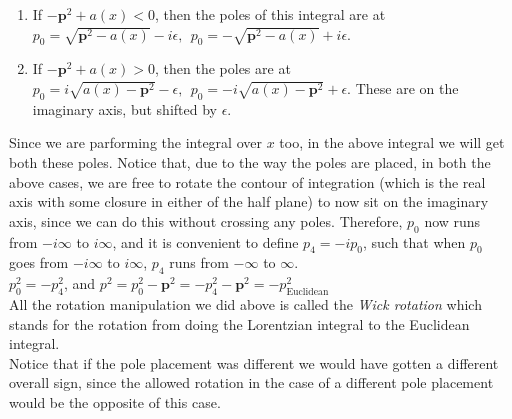 \documentclass[11pt]{article}
\numberwithin{equation}{section}
\begin{document}
\begin{enumerate}
    \item If \(-\textbf{p}^2 + a(x) <0\), then the poles of this integral are at \(p_0 = \sqrt{\textbf{p}^2 - a(x)} - i\epsilon,~~p_0 = -\sqrt{\textbf{p}^2 - a(x)} + i\epsilon\).
    \begin{figure}[h]
        \centering
    \end{figure} 
    \item If \(-\textbf{p}^2 + a(x) >0\), then the poles are at \(p_0 = i\sqrt{a(x)-\textbf{p}^2 } - \epsilon,~~p_0 = -i\sqrt{a(x)-\textbf{p}^2} + \epsilon\). These are on the imaginary axis, but shifted by \(\epsilon\).
    \begin{figure}[h]
        \centering
    \end{figure} 
\end{enumerate}
Since we are parforming the integral over \(x\) too, in the above integral we will get both these poles. Notice that, due to the way the poles are placed, in both the above cases, we are free to rotate the contour of integration (which is the real axis with some closure in either of the half plane) to now sit on the imaginary axis, since we can do this without crossing any poles. Therefore, \(p_0\) now runs from \(-i\infty\) to \(i\infty\), and it is convenient to define \(p_4 = -ip_0\), such that when \(p_0\) goes from \(-i\infty\) to \(i\infty\), \(p_4\) runs from \(-\infty\) to \(\infty\). \\
\(p_0^2 = - p_4^2\), and \(p^2 = p_0^2 - \textbf{p}^2 = -p_4^2 - \textbf{p}^2 = -p^2_{\text{Euclidean}}\)\\
All the rotation manipulation we did above is called the \textit{Wick rotation} which stands for the rotation from doing the Lorentzian integral to the Euclidean integral.\\

Notice that if the pole placement was different we would have gotten a different overall sign, since the allowed rotation in the case of a different pole placement would be the opposite of this case. \\
\end{document}
